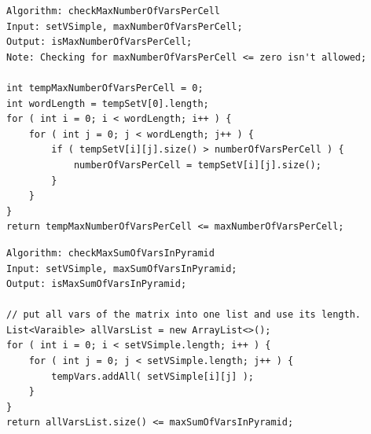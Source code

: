 \pagebreak
\lstset{language=java}
\begin{lstlisting}[frame=htrbl, caption={checkMaxNumberOfVarsPerCell}, 
label={lst:checkMaxNumberOfVarsPerCell}]
Algorithm: checkMaxNumberOfVarsPerCell
Input: setVSimple, maxNumberOfVarsPerCell;
Output: isMaxNumberOfVarsPerCell;
Note: Checking for maxNumberOfVarsPerCell <= zero isn't allowed;

int tempMaxNumberOfVarsPerCell = 0;
int wordLength = tempSetV[0].length;
for ( int i = 0; i < wordLength; i++ ) {
	for ( int j = 0; j < wordLength; j++ ) {
		if ( tempSetV[i][j].size() > numberOfVarsPerCell ) {
			numberOfVarsPerCell = tempSetV[i][j].size();
		}
	}
}
return tempMaxNumberOfVarsPerCell <= maxNumberOfVarsPerCell;
\end{lstlisting}

\pagebreak

\lstset{language=java}
\begin{lstlisting}[frame=htrbl, caption={checkMaxSumOfVarsInPyramid}, 
label={lst:checkMaxSumOfVarsInPyramid}]
Algorithm: checkMaxSumOfVarsInPyramid
Input: setVSimple, maxSumOfVarsInPyramid;
Output: isMaxSumOfVarsInPyramid;

// put all vars of the matrix into one list and use its length.
List<Varaible> allVarsList = new ArrayList<>();
for ( int i = 0; i < setVSimple.length; i++ ) {
	for ( int j = 0; j < setVSimple.length; j++ ) {
		tempVars.addAll( setVSimple[i][j] );
	}
}
return allVarsList.size() <= maxSumOfVarsInPyramid; 
\end{lstlisting}

\pagebreak

